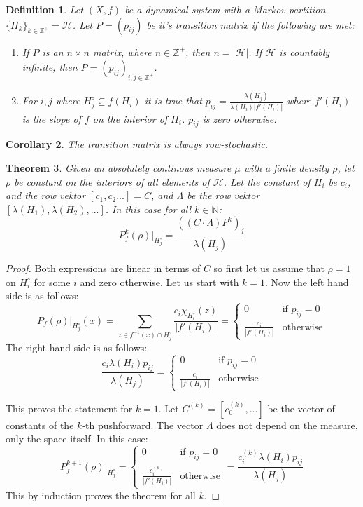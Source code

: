 \documentclass{article}
\newtheorem{theorem}{Theorem}[section]
\newtheorem{cor}[theorem]{Corollary}
\newtheorem{defin}[theorem]{Definition}
\begin{document}
\begin{defin}
Let $(X, f)$ be a dynamical system with a Markov-partition $\{H_k\}_{k\in \mathbb{Z}^+}= \mathscr{H}$.  Let $P = (p_{ij})$ be it's transition matrix if the following are met:
\begin{enumerate}
\item If $P$ is an $n\times n$ matrix, where $n\in \mathbb{Z^+}$, then $n = |\mathscr{H}|$. If $\mathscr{H}$ is countably infinite, then $P=(p_{ij})_{i,j\in \mathbb{Z^+}}$.
\item For $i,j$ where $H_j^\circ \subseteq f(H_i)$ it is true that $p_{ij} = \frac{\lambda(H_j)}{\lambda(H_i) |f'(H_i)|}$ where $f'(H_i)$ is the slope of $f$ on the interior of $H_i$. $p_{ij}$ is zero otherwise. 
\end{enumerate}
\end{defin}

\begin{cor}
The transition matrix is always row-stochastic.
\end{cor}

\begin{theorem} \label{perron}
Given an absolutely continous measure $\mu$ with a finite density $\rho$, let $\rho$ be constant on the interiors of all elements of $\mathscr{H}$. Let the constant of $H_i$ be $c_i$, and the row vektor $[c_1,c_2...]=C$, and $\Lambda$ be the row vektor $[\lambda (H_1), \lambda (H_2),...]$.
In this case for all $k\in \mathbb{N}$:\[
P_f^k(\rho)|_{H_j^\circ} = \frac{((C\cdot \Lambda)P^k)_j}{\lambda(H_j)}
\]
\end{theorem}

\begin{proof}
Both expressions are linear in terms of $C$ so first let us assume that $\rho = 1$ on $H_i^\circ$ for some $i$ and zero otherwise. Let us start with $k=1$. Now the left hand side is as follows:\[
P_f(\rho)|_{H_j^\circ}(x) = \sum_{z \in f^{-1}(x) \cap H_j^\circ} \frac{c_i \chi_{H_i^\circ}(z)}{|f'(H_i)|} =
\begin{cases}
		0 & \text{if } p_{ij}=0\\
		\frac{c_i}{|f'(H_i)|} & \text{otherwise}
	\end{cases}
\]
The right hand side is as follows: \[
\frac{c_i \lambda(H_i) p_{ij}}{\lambda(H_j)} =  \begin{cases}
		0 & \text{if } p_{ij}=0\\
		\frac{c_i}{|f'(H_i)|} & \text{otherwise}
	\end{cases}
\]

This proves the statement for $k=1$. Let $C^{(k)} = [c_0^{(k)},...]$ be the vector of constants of the $k$-th pushforward. The vector $\Lambda$ does not depend on the measure, only the space itself. In this case:\[
P_f^{k+1}(\rho)|_{H_j^\circ} =
\begin{cases}
		0 & \text{if } p_{ij}=0\\
		\frac{c_i^{(k)}}{|f'(H_i)|} & \text{otherwise}
	\end{cases} 
= \frac{c_i^{(k)} \lambda(H_i) p_{ij}}{\lambda(H_j)}
\]
This by induction proves the theorem for all $k$.
\end{proof}
\end{document}
